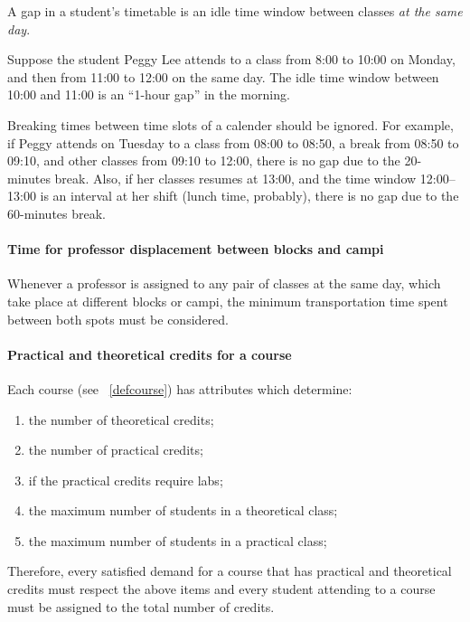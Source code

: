 A gap in a student's timetable is an idle time window between classes \textit{at the same day}.

Suppose the student Peggy Lee attends to a class from 8:00 to 10:00 on Monday, and then from 11:00 to 12:00 on the same day. The idle time window between 10:00 and 11:00 is an ``1-hour gap'' in the morning.

Breaking times between time slots of a calender should be ignored. For example, if Peggy attends on Tuesday to a class from 08:00 to 08:50, a break from 08:50 to 09:10, and other classes from 09:10 to 12:00, there is no gap due to the 20-minutes break. Also, if her classes resumes at 13:00, and the time window 12:00--13:00 is an interval at her shift (lunch time, probably), there is no gap due to the 60-minutes break.


\paragraph{Time for professor displacement between blocks and campi}
\label{constrprofdisplactime}

Whenever a professor is assigned to any pair of classes at the same day, which take place at different blocks or campi, the minimum transportation time spent between both spots must be considered.


\paragraph{Practical and theoretical credits for a course}
\label{constrptcourse}

Each course (see ~\ref{defcourse}) has attributes which determine:

\begin{enumerate}
\item the number of theoretical credits;
\item the number of practical credits;
\item if the practical credits require labs;
\item the maximum number of students in a theoretical class;
\item the maximum number of students in a practical class;
\end{enumerate}

Therefore, every satisfied demand for a course that has practical and theoretical credits must respect the above items and every student attending to a course must be assigned to the total number of credits.



